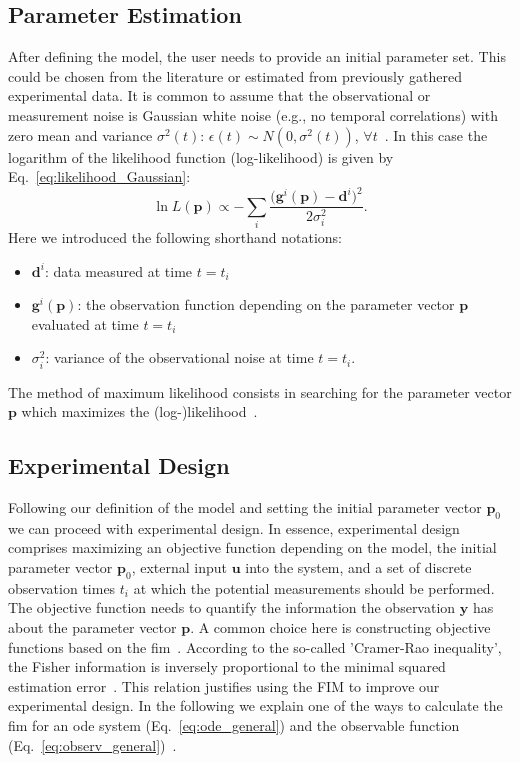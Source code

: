 \documentclass[graybox]{svmult}
\newcommand{\mbu}{\mathbf{u}}
\newcommand{\mbp}{\mathbf{p}}
\newcommand{\mby}{\mathbf{y}}
\newcommand{\mbd}{\mathbf{d}}
\begin{document}
\subsection{Parameter Estimation}
After defining the model, the user needs to provide an initial parameter set.
This could be chosen from the literature or estimated from previously gathered experimental data.
It is common to assume that the observational or measurement noise is Gaussian white noise (e.g., no temporal correlations) with zero mean and variance $\sigma^2(t)$: $\epsilon(t) \sim N(0, \sigma^2(t))$, $\forall t$~\cite{kreutzProfileLikelihood2013}.
In this case the logarithm of the likelihood function (log-likelihood) is given by Eq.~\ref{eq:likelihood_Gaussian}:
\begin{equation}
    \ln L(\mbp) \propto - \sum_{i}\frac{ \big(\mathbf{g}^{i}(\mbp) - \mbd^{i}\big)^2}{2 \sigma_{i}^2}.
    \label{eq:likelihood_Gaussian}
\end{equation}
Here we introduced the following shorthand notations:
\begin{itemize}
\item $\mbd^{i}$: data measured at time $t=t_i$
\item $\mathbf{g}^{i}(\mbp)$: the observation function depending on the parameter vector $\mbp$ evaluated at time $t=t_i$
\item $\sigma_{i}^2$: variance of the observational noise at time $t=t_i$.
\end{itemize}
The method of maximum likelihood consists in searching for the parameter vector $\mbp$ which maximizes the (log-)likelihood~\cite{gaborRobustEfficient2015}.
%
%
\subsection{Experimental Design}
Following our definition of the model and setting the initial parameter vector $\mbp_0$ we can proceed with experimental design.
In essence, experimental design comprises maximizing an objective function depending on the model, the initial parameter vector $\mbp_0$, external input $\mbu$ into the system, and a set of discrete observation times $t_i$ at which the potential measurements should be performed.
The objective function needs to quantify the information the observation $\mby$ has about the parameter vector $\mbp$.
A common choice here is constructing objective functions based on the \acf{fim}~\cite{lyTutorialFisher2017}.
According to the so-called 'Cramer-Rao inequality', the Fisher information is inversely proportional to the minimal squared estimation error~\cite{friedenExploratoryData2010}.
This relation justifies using the FIM to improve our experimental design.
In the following we explain one of the ways to calculate the \ac{fim} for an \ac{ode} system (Eq.~\ref{eq:ode_general}) and the observable function (Eq.~\ref{eq:observ_general})~\cite{lyTutorialFisher2017}.
%
%
\end{document}
